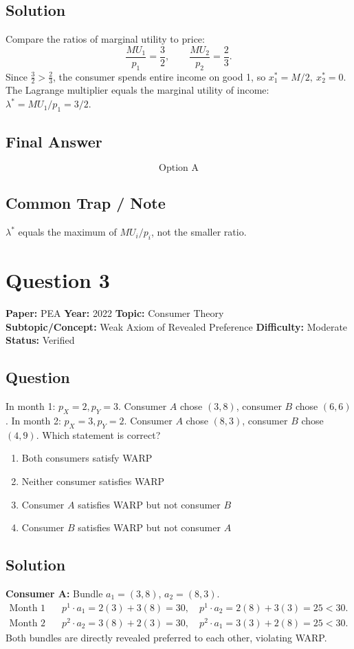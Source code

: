 \documentclass[11pt]{article}
\begin{document}
\subsection*{Solution}
Compare the ratios of marginal utility to price:
\[
\frac{MU_1}{p_1} = \frac{3}{2}, \qquad \frac{MU_2}{p_2} = \frac{2}{3}.
\]
Since $\tfrac{3}{2} > \tfrac{2}{3}$, the consumer spends entire income on good 1, so
$x_1^* = M/2,\ x_2^* = 0$. The Lagrange multiplier equals the marginal utility of income:
$\lambda^* = MU_1/p_1 = 3/2$.

\subsection*{Final Answer}
\[
\boxed{\text{Option A}}
\]

\subsection*{Common Trap / Note}
$\lambda^*$ equals the maximum of $MU_i/p_i$, not the smaller ratio.

\section*{Question 3}
\textbf{Paper:} PEA \quad \textbf{Year:} 2022 \quad \textbf{Topic:} Consumer Theory \\
\textbf{Subtopic/Concept:} Weak Axiom of Revealed Preference \quad \textbf{Difficulty:} Moderate \\
\textbf{Status:} Verified

\subsection*{Question}
In month 1: $p_X = 2, p_Y = 3$. Consumer $A$ chose $(3,8)$, consumer $B$ chose $(6,6)$.
In month 2: $p_X = 3, p_Y = 2$. Consumer $A$ chose $(8,3)$, consumer $B$ chose $(4,9)$.
Which statement is correct?
\begin{enumerate}[label=(\Alph*)]
\item Both consumers satisfy WARP
\item Neither consumer satisfies WARP
\item Consumer $A$ satisfies WARP but not consumer $B$
\item Consumer $B$ satisfies WARP but not consumer $A$
\end{enumerate}

\subsection*{Solution}
\textbf{Consumer A:} Bundle $a_1 = (3,8)$, $a_2 = (8,3)$.
\begin{align*}
\text{Month 1 budget:}\ & p^1 \cdot a_1 = 2(3)+3(8) = 30,\quad p^1 \cdot a_2 = 2(8)+3(3) = 25 < 30. \\
\text{Month 2 budget:}\ & p^2 \cdot a_2 = 3(8)+2(3) = 30,\quad p^2 \cdot a_1 = 3(3)+2(8) = 25 < 30.
\end{align*}
Both bundles are directly revealed preferred to each other, violating WARP.
\end{document}
